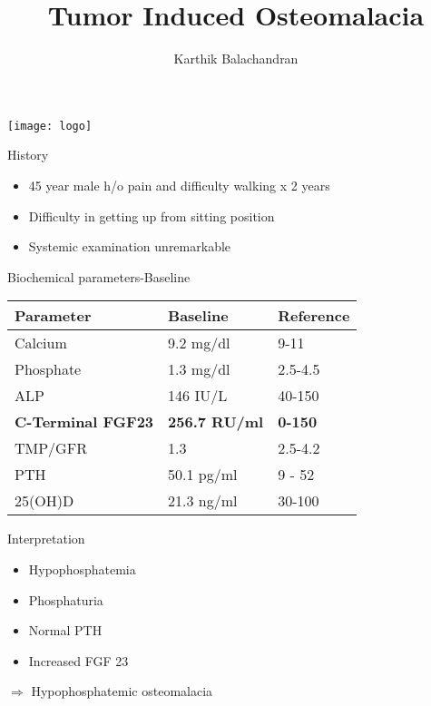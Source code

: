 \documentclass[english]{beamer} %
\begin{document}
\title[TIO]{Tumor Induced Osteomalacia}

\author{Karthik Balachandran}
\date{}

\begin{frame}
  \titlepage
  \vspace{-30pt}
  \begin{center}
    \texttt{[image: logo]}
  \end{center}
\end{frame}



\begin{frame}[<+->]{History}
\begin{itemize}
	\item 45 year male h/o pain and difficulty walking x 2 years
	\item Difficulty in getting up from sitting position
	\item Systemic examination unremarkable
\end{itemize}
\end{frame}
\begin{frame}{Biochemical parameters-Baseline}
\begin{center}
		\begin{tabular}{p{4cm}p{3.5cm}l}
			\toprule
			Parameter                 & Baseline             & Reference      \\ \midrule
			Calcium                   & 9.2 mg/dl            & 9-11           \\
			Phosphate                 & 1.3 mg/dl            & 2.5-4.5        \\
			ALP                       & 146 IU/L             & 40-150         \\
			\textbf{C-Terminal FGF23} & \textbf{256.7 RU/ml} & \textbf{0-150} \\
			TMP/GFR                   & 1.3                  & 2.5-4.2        \\
			PTH                       & 50.1 pg/ml           & 9 - 52         \\
			25(OH)D                   & 21.3 ng/ml           & 30-100 \\ \bottomrule
		\end{tabular} 
\end{center}
\end{frame}
\begin{frame}[<+->]{Interpretation}
	\begin{itemize}
		\item Hypophosphatemia
		\item Phosphaturia
		\item Normal PTH
		\item Increased FGF 23	
	\end{itemize}  \pause
	\bigskip
	$ \Longrightarrow $ Hypophosphatemic osteomalacia
\end{frame}
\end{document}

